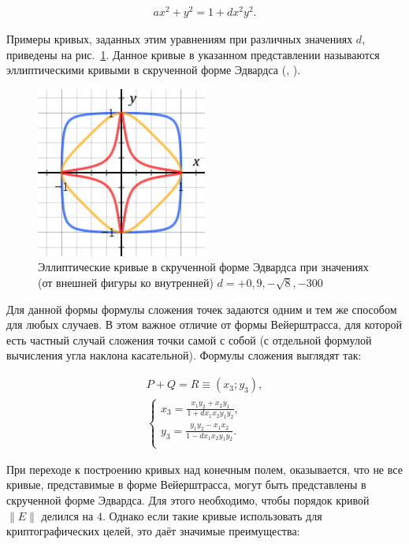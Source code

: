 \[ \begin{array}{l}
	ax^2+y^2=1+dx^2y^2.
\end{array} \]

Примеры кривых, заданных этим уравнениям при различных значениях $d$, приведены на рис.~\ref{pic:Edward-curves}. Данное кривые в указанном представлении называются эллиптическими кривыми в скрученной форме Эдвардса (, \cite{Bernstein:Birkner:Joye:Lange:Peters:2008}).

\begin{figure}
	\centering
	\includegraphics[width=0.5\textwidth]{pic/Edward-curves}
	\caption{Эллиптические кривые в скрученной форме Эдвардса при значениях (от внешней фигуры ко внутренней) $d = +0{,}9, -\sqrt{8}, -300$}
	\label{pic:Edward-curves}
\end{figure}

Для данной формы формулы сложения точек задаются одним и тем же способом для любых случаев. В этом важное отличие от формы Вейерштрасса, для которой есть частный случай сложения точки самой с собой (с отдельной формулой вычисления угла наклона касательной). Формулы сложения выглядят так:

\[ \begin{array}{ll}
	P + Q = R \equiv (x_3; y_3), \\
	
	\begin{cases}
		x_3 = \frac{x_1 y_2 + x_2 y_1}{ 1 + dx_1x_2y_1y_2},\\
		y_3 = \frac{ y_1 y_2 - x_1 x_2 }{1 - d x_1 x_2 y_1 y_2}.\\
	\end{cases}

\end{array} \]

При переходе к построению кривых над конечным полем, оказывается, что не все кривые, представимые в форме Вейерштрасса, могут быть представлены в скрученной форме Эдвардса. Для этого необходимо, чтобы порядок кривой $\|E\|$ делился на $4$. Однако если такие кривые использовать для криптографических целей, это даёт значимые преимущества:

